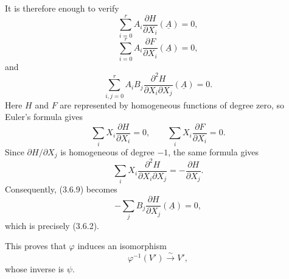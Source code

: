 It is therefore enough to verify
\begin{equation}\tag{3.6.7}
\sum_{i=0}^{r}A_i\frac{\partial H}{\partial X_i}(\underline A)=0,
\end{equation}
\begin{equation}\tag{3.6.8}
\sum_{i=0}^{r}A_i\frac{\partial F}{\partial X_i}(\underline A)=0,
\end{equation}
and
\begin{equation}\tag{3.6.9}
\sum_{i,j=0}^{r}A_iB_j
\frac{\partial^2H}{\partial X_i\partial X_j}(\underline A)=0.
\end{equation}
Here $H$ and $F$ are represented by homogeneous functions of degree
zero, so Euler's formula gives
\begin{equation}\tag{3.6.10}
\sum_iX_i\frac{\partial H}{\partial X_i}=0,
\qquad
\sum_iX_i\frac{\partial F}{\partial X_i}=0.
\end{equation}
Since $\partial H/\partial X_j$ is homogeneous of degree $-1$, the
same formula gives
\[
\sum_iX_i\frac{\partial^2H}{\partial X_i\partial X_j}
=-\frac{\partial H}{\partial X_j}.
\]
Consequently, (3.6.9) becomes
\begin{equation}\tag{3.6.11}
-\sum_jB_j\frac{\partial H}{\partial X_j}(\underline A)=0,
\end{equation}
which is precisely (3.6.2).

This proves that $\varphi$ induces an isomorphism
\begin{equation}\tag{3.6.12}
\varphi^{-1}(V')\xrightarrow{\sim}V',
\end{equation}
whose inverse is $\psi$.
